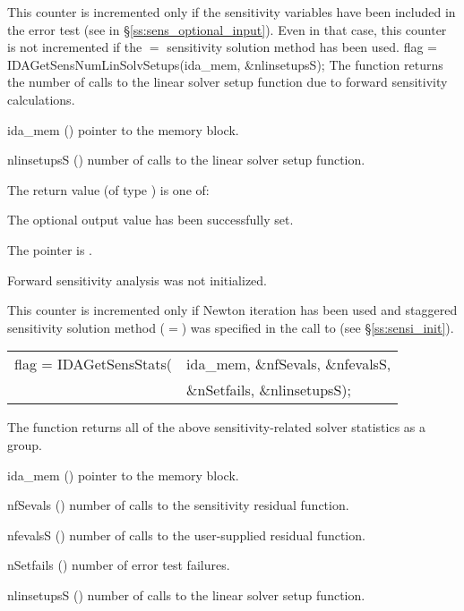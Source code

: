 {
  This counter is incremented only if the sensitivity variables have been included
  in the error test (see  in \S\ref{ss:sens_optional_input}). 
  Even in that case, this counter is not incremented if the $=$ 
  sensitivity solution method has been used.
}
{
  flag = IDAGetSensNumLinSolvSetups(ida\_mem, \&nlinsetupsS);
}
{
  The function  returns the number of calls
  to the linear solver setup function due to forward sensitivity calculations.
}
{
  \begin{args}
  \item[ida\_mem] ()
    pointer to the {\idas} memory block.
  \item[nlinsetupsS] ()
    number of calls to the linear solver setup function.
  \end{args}
}
{
  The return value  (of type ) is one of:
  \begin{args}
  \item[\Id{IDA\_SUCCESS}] 
    The optional output value has been successfully set.
  \item[\Id{IDA\_MEM\_NULL}]
    The  pointer is .
  \item[\Id{IDA\_NO\_SENS}]
    Forward sensitivity analysis was not initialized.
  \end{args}
}
{
  This counter is incremented only if Newton iteration has been used and
  staggered sensitivity solution method ($=$)
  was specified in the call to  (see \S\ref{ss:sensi_init}).
}
{
  \begin{tabular}[t]{@{}r@{}l@{}}
    flag = IDAGetSensStats(&ida\_mem, \&nfSevals, \&nfevalsS, \\
                             &\&nSetfails, \&nlinsetupsS);
  \end{tabular}
}
{
  The function  returns all of the above sensitivity-related solver
  statistics as a group.
}
{
  \begin{args}
  \item[ida\_mem] ()
    pointer to the {\idas} memory block.
  \item[nfSevals] ()
    number of calls to the sensitivity residual function.
  \item[nfevalsS] ()
    number of calls to the user-supplied residual function.
  \item[nSetfails] ()
    number of error test failures.
  \item[nlinsetupsS] ()
    number of calls to the linear solver setup function.
  \end{args}
}
